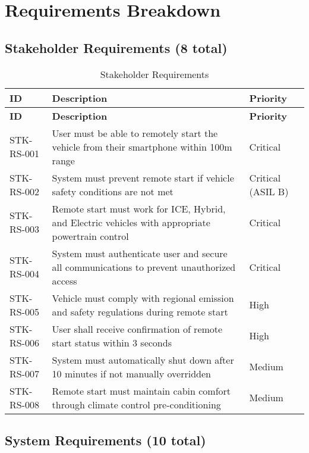 \documentclass[11pt,a4paper]{article}
\begin{document}
\section{Requirements Breakdown}

\subsection{Stakeholder Requirements (8 total)}

\begin{longtable}{|p{2.5cm}|p{10cm}|p{2cm}|}
\caption{Stakeholder Requirements}\label{tab:stakeholder_req}\\
\hline
\textbf{ID} & \textbf{Description} & \textbf{Priority} \\
\hline
\endfirsthead
\hline
\textbf{ID} & \textbf{Description} & \textbf{Priority} \\
\hline
\endhead
\hline
\endfoot

STK-RS-001 & User must be able to remotely start the vehicle from their smartphone within 100m range & Critical \\
\hline
STK-RS-002 & System must prevent remote start if vehicle safety conditions are not met & Critical (ASIL B) \\
\hline
STK-RS-003 & Remote start must work for ICE, Hybrid, and Electric vehicles with appropriate powertrain control & Critical \\
\hline
STK-RS-004 & System must authenticate user and secure all communications to prevent unauthorized access & Critical \\
\hline
STK-RS-005 & Vehicle must comply with regional emission and safety regulations during remote start & High \\
\hline
STK-RS-006 & User shall receive confirmation of remote start status within 3 seconds & High \\
\hline
STK-RS-007 & System must automatically shut down after 10 minutes if not manually overridden & Medium \\
\hline
STK-RS-008 & Remote start must maintain cabin comfort through climate control pre-conditioning & Medium \\
\hline
\end{longtable}

\subsection{System Requirements (10 total)}
\end{document}

